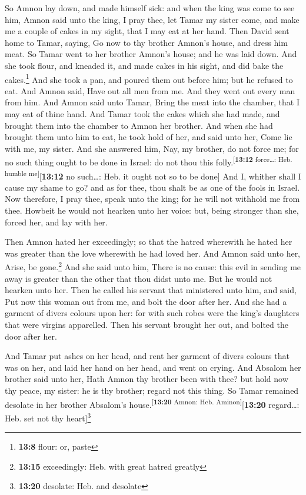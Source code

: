  So Amnon lay down, and made himself sick: and when the
king was come to see him, Amnon said unto the king, I pray thee, let
Tamar my sister come, and make me a couple of cakes in my sight, that I
may eat at her hand.  Then David sent home to Tamar,
saying, Go now to thy brother Amnon's house, and dress him meat.
 So Tamar went to her brother Amnon's house; and he was
laid down. And she took flour, and kneaded it, and made cakes in his
sight, and did bake the cakes.\footnote{\textbf{13:8} flour: or, paste}
 And she took a pan, and poured them out before him; but
he refused to eat. And Amnon said, Have out all men from me. And they
went out every man from him.  And Amnon said unto Tamar,
Bring the meat into the chamber, that I may eat of thine hand. And Tamar
took the cakes which she had made, and brought them into the chamber to
Amnon her brother.  And when she had brought them unto
him to eat, he took hold of her, and said unto her, Come lie with me, my
sister.  And she answered him, Nay, my brother, do not
force me; for no such thing ought to be done in Israel: do not thou this
folly.\textsuperscript{{[}\textbf{13:12} force\ldots: Heb. humble
me{]}}{[}\textbf{13:12} no such\ldots: Heb. it ought not so to be
done{]}  And I, whither shall I cause my shame to go? and
as for thee, thou shalt be as one of the fools in Israel. Now therefore,
I pray thee, speak unto the king; for he will not withhold me from thee.
 Howbeit he would not hearken unto her voice: but, being
stronger than she, forced her, and lay with her.

 Then Amnon hated her exceedingly; so that the hatred
wherewith he hated her was greater than the love wherewith he had loved
her. And Amnon said unto her, Arise, be gone.\footnote{\textbf{13:15}
  exceedingly: Heb. with great hatred greatly}  And she
said unto him, There is no cause: this evil in sending me away is
greater than the other that thou didst unto me. But he would not hearken
unto her.  Then he called his servant that ministered
unto him, and said, Put now this woman out from me, and bolt the door
after her.  And she had a garment of divers colours upon
her: for with such robes were the king's daughters that were virgins
apparelled. Then his servant brought her out, and bolted the door after
her.

 And Tamar put ashes on her head, and rent her garment of
divers colours that was on her, and laid her hand on her head, and went
on crying.  And Absalom her brother said unto her, Hath
Amnon thy brother been with thee? but hold now thy peace, my sister: he
is thy brother; regard not this thing. So Tamar remained desolate in her
brother Absalom's house.\textsuperscript{{[}\textbf{13:20} Amnon: Heb.
Aminon{]}}{[}\textbf{13:20} regard\ldots: Heb. set not thy
heart{]}\footnote{\textbf{13:20} desolate: Heb. and desolate}

